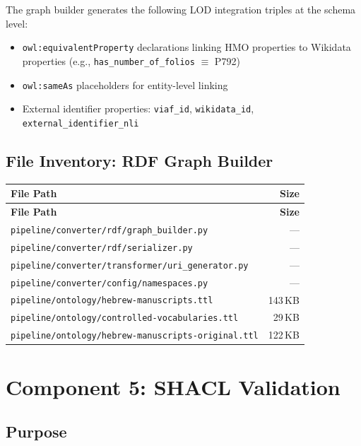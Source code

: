 \documentclass[12pt]{article}
\newcommand{\filepath}[1]{\texttt{\small #1}}
\newcommand{\code}[1]{\texttt{#1}}
\begin{document}
The graph builder generates the following LOD integration triples at the schema level:

\begin{itemize}
\item \code{owl:equivalentProperty} declarations linking HMO properties to Wikidata properties (e.g., \code{has\_number\_of\_folios} $\equiv$ P792)
\item \code{owl:sameAs} placeholders for entity-level linking
\item External identifier properties: \code{viaf\_id}, \code{wikidata\_id}, \code{external\_identifier\_nli}
\end{itemize}

\subsection{File Inventory: RDF Graph Builder}

\begin{longtable}{|p{10cm}|r|}
\hline
\textbf{File Path} & \textbf{Size} \\
\hline
\endfirsthead
\hline
\textbf{File Path} & \textbf{Size} \\
\hline
\endhead
\hline
\endfoot
\filepath{pipeline/converter/rdf/graph\_builder.py} & --- \\
\hline
\filepath{pipeline/converter/rdf/serializer.py} & --- \\
\hline
\filepath{pipeline/converter/transformer/uri\_generator.py} & --- \\
\hline
\filepath{pipeline/converter/config/namespaces.py} & --- \\
\hline
\filepath{pipeline/ontology/hebrew-manuscripts.ttl} & 143\,KB \\
\hline
\filepath{pipeline/ontology/controlled-vocabularies.ttl} & 29\,KB \\
\hline
\filepath{pipeline/ontology/hebrew-manuscripts-original.ttl} & 122\,KB \\
\hline
\end{longtable}


\section{Component 5: SHACL Validation}
\label{sec:shacl}

\subsection{Purpose}
\end{document}
